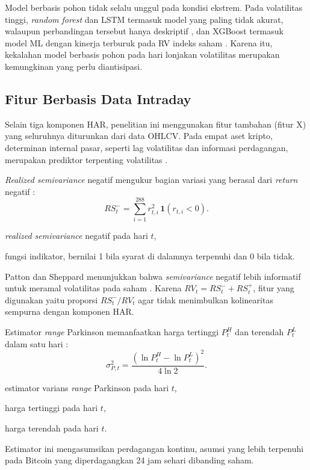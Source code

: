 Model berbasis pohon tidak selalu unggul pada kondisi ekstrem. Pada
volatilitas tinggi, \textit{random forest} dan LSTM termasuk model yang paling
tidak akurat, walaupun perbandingan tersebut hanya deskriptif
\cite{dudek2024}, dan XGBoost termasuk model ML dengan kinerja terburuk pada
RV indeks saham \cite{kilic2025}. Karena itu, kekalahan model berbasis pohon pada
hari lonjakan volatilitas merupakan kemungkinan yang perlu diantisipasi.

\subsection{Fitur Berbasis Data Intraday}
Selain tiga komponen HAR, penelitian ini menggunakan fitur tambahan (fitur X)
yang seluruhnya diturunkan dari data OHLCV. Pada empat aset kripto,
determinan internal pasar, seperti lag volatilitas dan informasi perdagangan,
merupakan prediktor terpenting volatilitas \cite{wang2023}.

\textit{Realized semivariance} negatif mengukur bagian variasi yang berasal
dari \textit{return} negatif \cite{barndorff2010}:
\begin{equation}
  RS_t^- = \sum_{i=1}^{288} r_{t,i}^2 \, \mathbf{1}(r_{t,i} < 0).
  \label{eq:semivarians}
\end{equation}
\begin{keterangan}
  \item[$RS_t^-$] \textit{realized semivariance} negatif pada hari $t$,
  \item[$\mathbf{1}(\cdot)$] fungsi indikator, bernilai 1 bila syarat di
    dalamnya terpenuhi dan 0 bila tidak.
\end{keterangan}
Patton dan Sheppard menunjukkan bahwa \textit{semivariance} negatif lebih
informatif untuk meramal volatilitas pada saham \cite{patton2015}. Karena
$RV_t = RS_t^- + RS_t^+$, fitur yang digunakan yaitu proporsi $RS_t^-/RV_t$
agar tidak menimbulkan kolinearitas sempurna dengan komponen HAR.

Estimator \textit{range} Parkinson memanfaatkan harga tertinggi $P^{H}_t$ dan
terendah $P^{L}_t$ dalam satu hari \cite{parkinson1980}:
\begin{equation}
  \sigma^2_{P,t} = \frac{(\ln P^{H}_t - \ln P^{L}_t)^2}{4 \ln 2}.
  \label{eq:parkinson}
\end{equation}
\begin{keterangan}
  \item[$\sigma^2_{P,t}$] estimator varians \textit{range} Parkinson
    pada hari $t$,
  \item[$P^{H}_t$] harga tertinggi pada hari $t$,
  \item[$P^{L}_t$] harga terendah pada hari $t$.
\end{keterangan}
Estimator ini mengasumsikan perdagangan kontinu, asumsi yang lebih terpenuhi
pada Bitcoin yang diperdagangkan 24 jam sehari dibanding saham.

